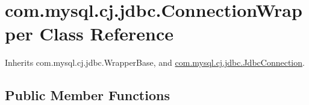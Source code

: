 \hypertarget{classcom_1_1mysql_1_1cj_1_1jdbc_1_1_connection_wrapper}{}\section{com.\+mysql.\+cj.\+jdbc.\+Connection\+Wrapper Class Reference}
\label{classcom_1_1mysql_1_1cj_1_1jdbc_1_1_connection_wrapper}


Inherits com.\+mysql.\+cj.\+jdbc.\+Wrapper\+Base, and \mbox{\hyperlink{interfacecom_1_1mysql_1_1cj_1_1jdbc_1_1_jdbc_connection}{com.\+mysql.\+cj.\+jdbc.\+Jdbc\+Connection}}.

\subsection*{Public Member Functions}
